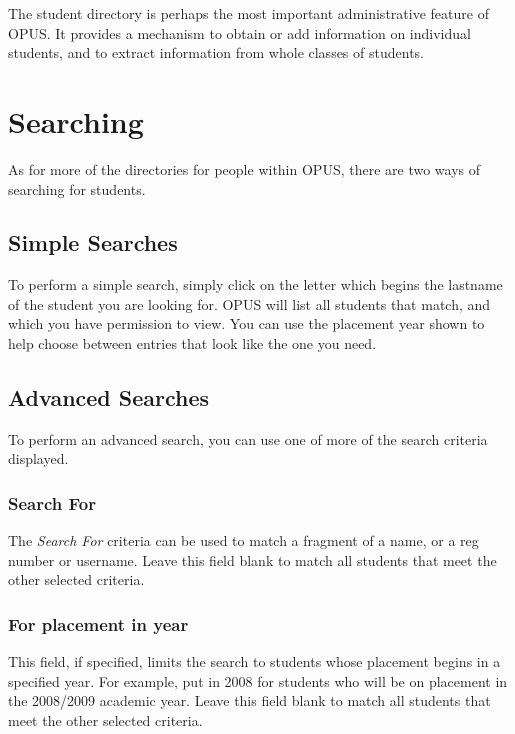 \documentclass[12 pt]{book}
\begin{document}
The student directory is perhaps the most important administrative feature of OPUS. It provides
a mechanism to obtain or add information on individual students, and to extract information from
whole classes of students.

\section{Searching}

As for more of the directories for people within OPUS, there are two ways of
searching for students.

\subsection{Simple Searches}

To perform a simple search, simply click on the letter which begins the lastname
of the student you are looking for. OPUS will list all students that match, and
which you have permission to view. You can use the placement year shown to help
choose between entries that look like the one you need.

\subsection{Advanced Searches}

To perform an advanced search, you can use one of more of the search criteria
displayed.


\subsubsection{Search For}

The \emph{Search For} criteria can be used to match a fragment of a name, or a
reg number or username. Leave this field blank to match all students that meet
the other selected criteria.

\subsubsection{For placement in year}

This field, if specified, limits the search to students whose placement begins
in a specified year. For example, put in 2008 for students who will be on
placement in the 2008/2009 academic year. Leave this field blank to match all
students that meet the other selected criteria.
\end{document}
